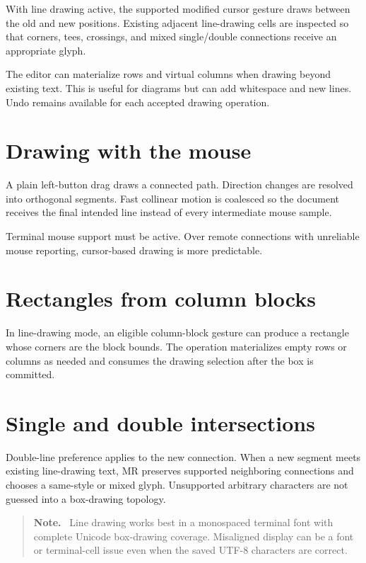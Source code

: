 \documentclass[a4paper,10pt,twoside,openany]{book}
\newcommand{\mr}{\textsc{MR}}
\newenvironment{usernote}{\begin{quote}\small\textbf{Note.}\ }{\end{quote}}
\begin{document}
With line drawing active, the supported modified cursor gesture draws between
the old and new positions. Existing adjacent line-drawing cells are inspected
so that corners, tees, crossings, and mixed single/double connections receive
an appropriate glyph.

The editor can materialize rows and virtual columns when drawing beyond
existing text. This is useful for diagrams but can add whitespace and new
lines. Undo remains available for each accepted drawing operation.

\section{Drawing with the mouse}

A plain left-button drag draws a connected path. Direction changes are
resolved into orthogonal segments. Fast collinear motion is coalesced so the
document receives the final intended line instead of every intermediate mouse
sample.

Terminal mouse support must be active. Over remote connections with unreliable
mouse reporting, cursor-based drawing is more predictable.

\section{Rectangles from column blocks}

In line-drawing mode, an eligible column-block gesture can produce a rectangle
whose corners are the block bounds. The operation materializes empty rows or
columns as needed and consumes the drawing selection after the box is
committed.

\section{Single and double intersections}

Double-line preference applies to the new connection. When a new segment
meets existing line-drawing text, \mr{} preserves supported neighboring
connections and chooses a same-style or mixed glyph. Unsupported arbitrary
characters are not guessed into a box-drawing topology.

\begin{usernote}
Line drawing works best in a monospaced terminal font with complete Unicode
box-drawing coverage. Misaligned display can be a font or terminal-cell issue
even when the saved UTF-8 characters are correct.
\end{usernote}
\end{document}
